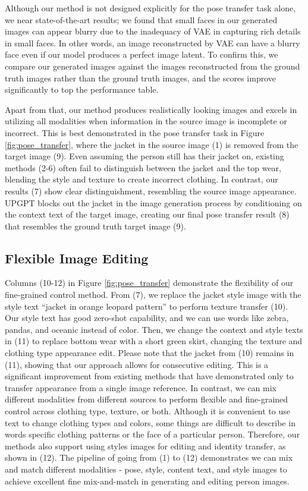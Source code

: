 \documentclass[10pt,twocolumn,letterpaper]{article}
\begin{document}
Although our method is not designed explicitly for the pose transfer task alone, we near state-of-the-art results; we found that small faces in our generated images can appear blurry due to the inadequacy of VAE in capturing rich details in small faces. In other words, an image  reconstructed  by VAE can have a blurry face even if our model produces a perfect image latent. To confirm this, we compare our generated images against the images reconstructed from the ground truth images rather than the ground truth images, and the scores improve significantly to top the performance table. 

Apart from that, our method produces realistically looking images and excels in utilizing all modalities when information in the source image is incomplete or incorrect. This is best demonstrated in the pose transfer task in Figure \ref{fig:pose_transfer}, where the jacket in the source image (1) is removed from the target image (9). Even assuming the person still has their jacket on, existing methods (2-6) often fail to distinguish between the jacket and the top wear, blending the style and texture to create incorrect clothing. In contrast, our results (7) show clear distinguishment, resembling the source image appearance. UPGPT blocks out the jacket in the image generation process by conditioning on the context text of the target image, creating our final pose transfer result (8) that resembles the ground truth target image (9). 

\subsection{Flexible Image Editing}
Columns (10-12) in Figure \ref{fig:pose_transfer} demonstrate the flexibility of our fine-grained control method. From (7), we replace the jacket style image with the style text ``jacket in orange leopard pattern'' to perform texture transfer (10). Our style text has good zero-shot capability, and we can use words like zebra, pandas, and oceanic instead of color. Then, we change the context and style texts in (11) to replace bottom wear with a short green skirt, changing the texture and clothing type \ie appearance edit. Please note that the jacket from (10) remains in (11), showing that our approach allows for consecutive editing. This is a significant improvement from existing methods \cite{casd, nted, persion_dm} that have demonstrated only to transfer appearance from a single image reference. In contrast, we can mix different modalities from different sources to perform flexible and fine-grained control across clothing type, texture, or both. Although it is convenient to use text to change clothing types and colors, some things are difficult to describe in words \eg specific clothing patterns or the face of a particular person. Therefore, our methods also support using styles images for editing and identity transfer, as shown in (12). The pipeline of going from (1) to (12) demonstrates we can mix and match different modalities - pose, style, content text, and style images to achieve excellent fine mix-and-match in generating and editing person images. 
\end{document}
